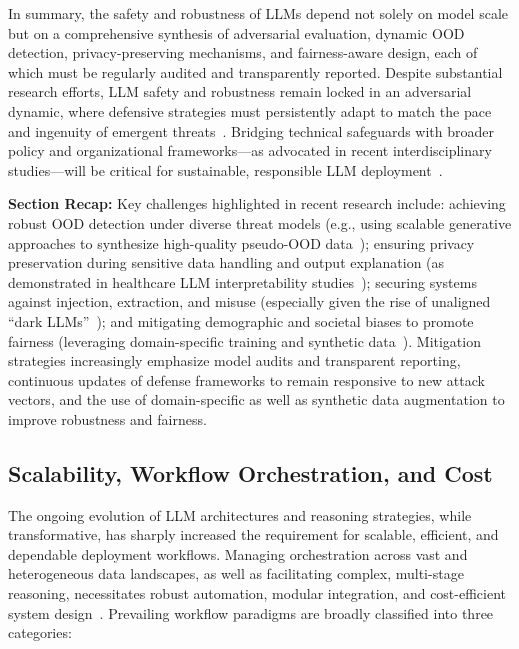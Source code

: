 \documentclass[sigconf]{acmart}
\begin{document}
In summary, the safety and robustness of LLMs depend not solely on model scale but on a comprehensive synthesis of adversarial evaluation, dynamic OOD detection, privacy-preserving mechanisms, and fairness-aware design, each of which must be regularly audited and transparently reported. Despite substantial research efforts, LLM safety and robustness remain locked in an adversarial dynamic, where defensive strategies must persistently adapt to match the pace and ingenuity of emergent threats~\cite{ref1,ref43,ref78,ref82}. Bridging technical safeguards with broader policy and organizational frameworks—as advocated in recent interdisciplinary studies—will be critical for sustainable, responsible LLM deployment~\cite{ref22,ref52}.

\textbf{Section Recap:} Key challenges highlighted in recent research include: achieving robust OOD detection under diverse threat models (e.g., using scalable generative approaches to synthesize high-quality pseudo-OOD data~\cite{ref78}); ensuring privacy preservation during sensitive data handling and output explanation (as demonstrated in healthcare LLM interpretability studies~\cite{ref1}); securing systems against injection, extraction, and misuse (especially given the rise of unaligned “dark LLMs”~\cite{ref82}); and mitigating demographic and societal biases to promote fairness (leveraging domain-specific training and synthetic data~\cite{ref2}). Mitigation strategies increasingly emphasize model audits and transparent reporting, continuous updates of defense frameworks to remain responsive to new attack vectors, and the use of domain-specific as well as synthetic data augmentation to improve robustness and fairness.

\subsection{Scalability, Workflow Orchestration, and Cost}

The ongoing evolution of LLM architectures and reasoning strategies, while transformative, has sharply increased the requirement for scalable, efficient, and dependable deployment workflows. Managing orchestration across vast and heterogeneous data landscapes, as well as facilitating complex, multi-stage reasoning, necessitates robust automation, modular integration, and cost-efficient system design~\cite{ref5,ref8,ref9,ref12,ref37,ref43,ref50,ref55,ref57,ref60,ref64,ref79,ref80,ref86,ref88,ref89,ref104}. Prevailing workflow paradigms are broadly classified into three categories:
\end{document}

